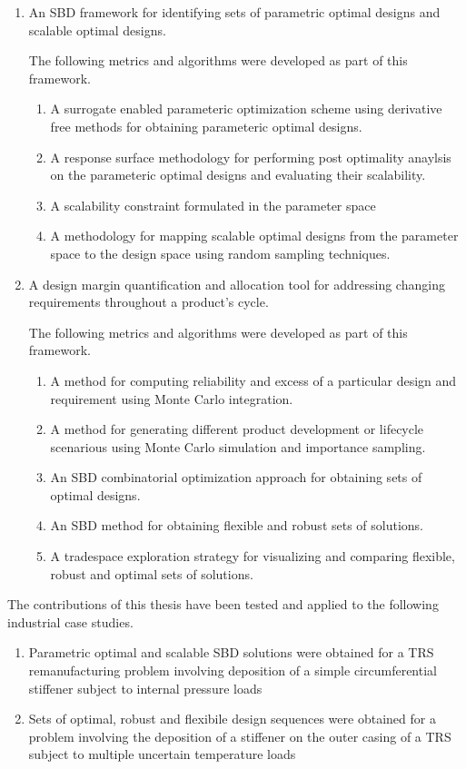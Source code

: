 \begin{enumerate}
	\item{An \ac{SBD} framework for identifying sets of parametric optimal designs and scalable optimal designs.}
	
	The following metrics and algorithms were developed as part of this framework.
	
	\begin{enumerate}
		\item{A surrogate enabled parameteric optimization scheme using derivative free methods for obtaining parameteric optimal designs.}
		\item{A response surface methodology for performing post optimality anaylsis on the parameteric optimal designs and evaluating their scalability.}
		\item{A scalability constraint formulated in the parameter space}
		\item{A methodology for mapping scalable optimal designs from the parameter space to the design space using random sampling techniques.}
	\end{enumerate}
	\item{A design margin quantification and allocation tool for addressing changing requirements throughout a product's cycle.}
	
	The following metrics and algorithms were developed as part of this framework.
	
	\begin{enumerate}
		\item{A method for computing reliability and excess of a particular design and requirement using Monte Carlo integration.}
		\item{A method for generating different product development or lifecycle scenarious using Monte Carlo simulation and importance sampling.}
		\item{An \ac{SBD} combinatorial optimization approach for obtaining sets of optimal designs.}
		\item{An \ac{SBD} method for obtaining flexible and robust sets of solutions.}
		\item{A tradespace exploration strategy for visualizing and comparing flexible, robust and optimal sets of solutions.}
	\end{enumerate}
\end{enumerate}

The contributions of this thesis have been tested and applied to the following industrial case studies.

\begin{enumerate}
	\item{Parametric optimal and scalable \ac{SBD} solutions were obtained for a \ac{TRS} remanufacturing problem involving deposition of a simple circumferential stiffener subject to internal pressure loads}
	\item{Sets of optimal, robust and flexibile design sequences were obtained for a problem involving the deposition of a stiffener on the outer casing of a \ac{TRS} subject to multiple uncertain temperature loads}
\end{enumerate}

